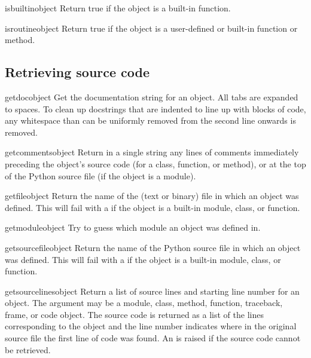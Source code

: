 \begin{funcdesc}{isbuiltin}{object}
  Return true if the object is a built-in function.
\end{funcdesc}

\begin{funcdesc}{isroutine}{object}
  Return true if the object is a user-defined or built-in function or method.
\end{funcdesc}

\subsection{Retrieving source code
            \label{inspect-source}}

\begin{funcdesc}{getdoc}{object}
  Get the documentation string for an object.
  All tabs are expanded to spaces.  To clean up docstrings that are
  indented to line up with blocks of code, any whitespace than can be
  uniformly removed from the second line onwards is removed.
\end{funcdesc}

\begin{funcdesc}{getcomments}{object}
  Return in a single string any lines of comments immediately preceding
  the object's source code (for a class, function, or method), or at the
  top of the Python source file (if the object is a module).
\end{funcdesc}

\begin{funcdesc}{getfile}{object}
  Return the name of the (text or binary) file in which an object was
  defined.  This will fail with a  if the object
  is a built-in module, class, or function.
\end{funcdesc}

\begin{funcdesc}{getmodule}{object}
  Try to guess which module an object was defined in.
\end{funcdesc}

\begin{funcdesc}{getsourcefile}{object}
  Return the name of the Python source file in which an object was
  defined.  This will fail with a  if the object
  is a built-in module, class, or function.
\end{funcdesc}

\begin{funcdesc}{getsourcelines}{object}
  Return a list of source lines and starting line number for an object.
  The argument may be a module, class, method, function, traceback, frame,
  or code object.  The source code is returned as a list of the lines
  corresponding to the object and the line number indicates where in the
  original source file the first line of code was found.  An
   is raised if the source code cannot be retrieved.
\end{funcdesc}

